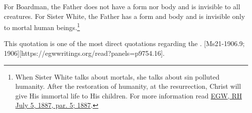 \begin{table}[H]
\centering
\renewcommand{\arraystretch}{1.5}
\setlength{\tabcolsep}{15pt}
\end{table}

For Boardman, the Father does not have a form nor body and is invisible to all creatures. For Sister White, the Father has a form and body and is invisible only to mortal human beings.\footnote{When Sister White talks about mortals, she talks about sin polluted humanity. After the restoration of humanity, at the resurrection, Christ will give His immortal life to His children. For more information read \href{https://egwwritings.org/?ref=en_RH.July.5.1887.par.5}{EGW, RH July 5, 1887, par. 5; 1887}.}

This quotation is one of the most direct quotations regarding the . [Ms21-1906.9; 1906][https://egwwritings.org/read?panels=p9754.16].

